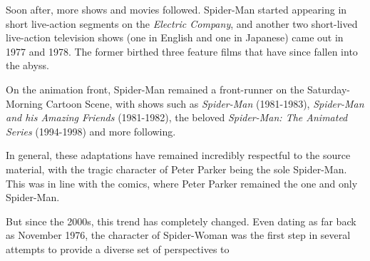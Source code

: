 \documentclass[conference]{IEEEtran}
\begin{document}
Soon after, more shows and movies followed. Spider-Man started appearing in short live-action segments on the \textit{Electric Company}, and another two short-lived live-action television shows (one in English and one in Japanese) came out in 1977 and 1978. The former birthed three feature films that have since fallen into the abyss.

On the animation front, Spider-Man remained a front-runner on the Saturday-Morning Cartoon Scene, with shows such as \textit{Spider-Man} (1981-1983), \textit{Spider-Man and his Amazing Friends} (1981-1982), the beloved \textit{Spider-Man: The Animated Series} (1994-1998) and more following.

In general, these adaptations have remained incredibly respectful to the source material, with the tragic character of Peter Parker being the sole Spider-Man. This was in line with the comics, where Peter Parker remained the one and only Spider-Man.

But since the 2000s, this trend has completely changed. Even dating as far back as November 1976, the character of Spider-Woman was the first step in several attempts to provide a diverse set of perspectives to 



\end{document}
